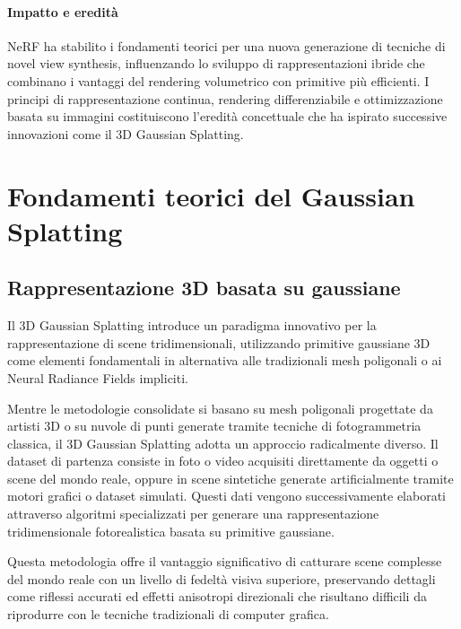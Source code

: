 \paragraph{Impatto e eredità}
NeRF ha stabilito i fondamenti teorici per una nuova generazione di tecniche di novel view synthesis, influenzando lo sviluppo di rappresentazioni ibride che combinano i vantaggi del rendering volumetrico con primitive più efficienti. I principi di rappresentazione continua, rendering differenziabile e ottimizzazione basata su immagini costituiscono l'eredità concettuale che ha ispirato successive innovazioni come il 3D Gaussian Splatting.
\section{Fondamenti teorici del Gaussian Splatting}
\subsection{Rappresentazione 3D basata su gaussiane}

Il 3D Gaussian Splatting introduce un paradigma innovativo per la rappresentazione di scene tridimensionali, utilizzando primitive gaussiane 3D come elementi fondamentali in alternativa alle tradizionali mesh poligonali o ai Neural Radiance Fields impliciti.

Mentre le metodologie consolidate si basano su mesh poligonali progettate da artisti 3D o su nuvole di punti generate tramite tecniche di fotogrammetria classica, il 3D Gaussian Splatting adotta un approccio radicalmente diverso. Il dataset di partenza consiste in foto o video acquisiti direttamente da oggetti o scene del mondo reale, oppure in scene sintetiche generate artificialmente tramite motori grafici o dataset simulati. Questi dati vengono successivamente elaborati attraverso algoritmi specializzati per generare una rappresentazione tridimensionale fotorealistica basata su primitive gaussiane.

Questa metodologia offre il vantaggio significativo di catturare scene complesse del mondo reale con un livello di fedeltà visiva superiore, preservando dettagli come riflessi accurati ed effetti anisotropi direzionali che risultano difficili da riprodurre con le tecniche tradizionali di computer grafica.

